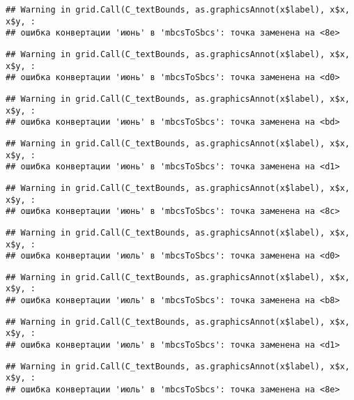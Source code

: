 \documentclass[
]{article}
\begin{document}
\begin{verbatim}
## Warning in grid.Call(C_textBounds, as.graphicsAnnot(x$label), x$x, x$y, :
## ошибка конвертации 'июнь' в 'mbcsToSbcs': точка заменена на <8e>
\end{verbatim}

\begin{verbatim}
## Warning in grid.Call(C_textBounds, as.graphicsAnnot(x$label), x$x, x$y, :
## ошибка конвертации 'июнь' в 'mbcsToSbcs': точка заменена на <d0>
\end{verbatim}

\begin{verbatim}
## Warning in grid.Call(C_textBounds, as.graphicsAnnot(x$label), x$x, x$y, :
## ошибка конвертации 'июнь' в 'mbcsToSbcs': точка заменена на <bd>
\end{verbatim}

\begin{verbatim}
## Warning in grid.Call(C_textBounds, as.graphicsAnnot(x$label), x$x, x$y, :
## ошибка конвертации 'июнь' в 'mbcsToSbcs': точка заменена на <d1>
\end{verbatim}

\begin{verbatim}
## Warning in grid.Call(C_textBounds, as.graphicsAnnot(x$label), x$x, x$y, :
## ошибка конвертации 'июнь' в 'mbcsToSbcs': точка заменена на <8c>
\end{verbatim}

\begin{verbatim}
## Warning in grid.Call(C_textBounds, as.graphicsAnnot(x$label), x$x, x$y, :
## ошибка конвертации 'июль' в 'mbcsToSbcs': точка заменена на <d0>
\end{verbatim}

\begin{verbatim}
## Warning in grid.Call(C_textBounds, as.graphicsAnnot(x$label), x$x, x$y, :
## ошибка конвертации 'июль' в 'mbcsToSbcs': точка заменена на <b8>
\end{verbatim}

\begin{verbatim}
## Warning in grid.Call(C_textBounds, as.graphicsAnnot(x$label), x$x, x$y, :
## ошибка конвертации 'июль' в 'mbcsToSbcs': точка заменена на <d1>
\end{verbatim}

\begin{verbatim}
## Warning in grid.Call(C_textBounds, as.graphicsAnnot(x$label), x$x, x$y, :
## ошибка конвертации 'июль' в 'mbcsToSbcs': точка заменена на <8e>
\end{verbatim}
\end{document}
